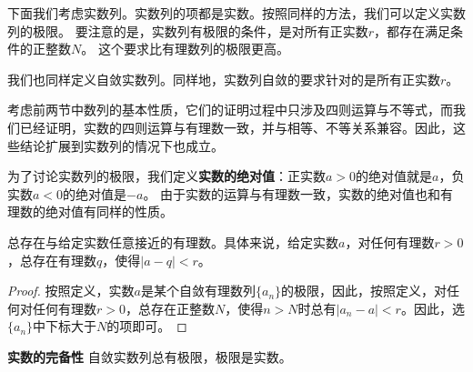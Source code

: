 \documentclass[12pt,UTF8,fontset=none]{ctexbook}
\begin{document}
\begin{appendix}
下面我们考虑实数列。实数列的项都是实数。按照同样的方法，我们可以定义实数列的极限。
要注意的是，实数列有极限的条件，是对所有正实数$r$，都存在满足条件的正整数$N$。
这个要求比有理数列的极限更高。

我们也同样定义自敛实数列。同样地，实数列自敛的要求针对的是所有正实数$r$。

考虑前两节中数列的基本性质，它们的证明过程中只涉及四则运算与不等式，而我们已经证明，实数的四则运算与有理数一致，并与相等、不等关系兼容。因此，这些结论扩展到实数列的情况下也成立。

为了讨论实数列的极限，我们定义\textbf{实数的绝对值}：正实数$a>0$的绝对值就是$a$，负实数$a<0$的绝对值是$-a$。
由于实数的运算与有理数一致，实数的绝对值也和有理数的绝对值有同样的性质。

\begin{tm}\label{tm:a-1-35}
    总存在与给定实数任意接近的有理数。具体来说，给定实数$a$，对任何有理数$r>0$，总存在有理数$q$，使得$|a - q| < r$。
\end{tm}
\begin{proof}
    按照定义，实数$a$是某个自敛有理数列$\{a_n\}$的极限，因此，按照定义，对任何对任何有理数$r>0$，总存在正整数$N$，使得$n>N$时总有$|a_n - a| < r$。因此，选$\{a_n\}$中下标大于$N$的项即可。
\end{proof}

\begin{tm}\textbf{实数的完备性}\label{tm:a-1-40}
    自敛实数列总有极限，极限是实数。
\end{tm}


\end{appendix}
\end{document}
